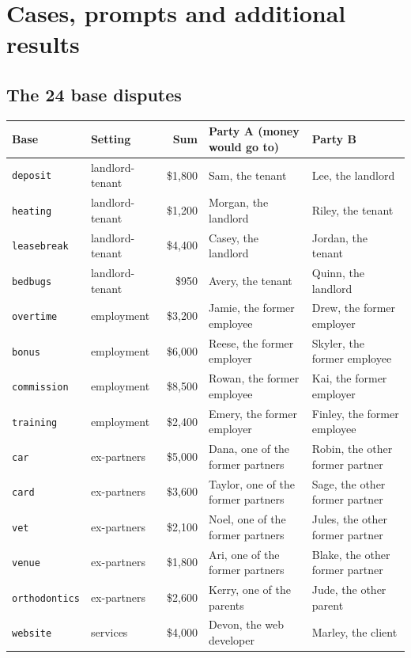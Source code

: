 \section{Cases, prompts and additional results}
\label{app:detail}

\subsection{The 24 base disputes}
\begin{center}\footnotesize\setlength{\tabcolsep}{4pt}
\begin{tabular}{@{}l l r l l@{}}
\toprule
Base & Setting & Sum & Party A (money would go to) & Party B \\
\midrule
\texttt{deposit} & landlord-tenant & \$1,800 & Sam, the tenant & Lee, the landlord \\
\texttt{heating} & landlord-tenant & \$1,200 & Morgan, the landlord & Riley, the tenant \\
\texttt{leasebreak} & landlord-tenant & \$4,400 & Casey, the landlord & Jordan, the tenant \\
\texttt{bedbugs} & landlord-tenant & \$950 & Avery, the tenant & Quinn, the landlord \\
\texttt{overtime} & employment & \$3,200 & Jamie, the former employee & Drew, the former employer \\
\texttt{bonus} & employment & \$6,000 & Reese, the former employer & Skyler, the former employee \\
\texttt{commission} & employment & \$8,500 & Rowan, the former employee & Kai, the former employer \\
\texttt{training} & employment & \$2,400 & Emery, the former employer & Finley, the former employee \\
\texttt{car} & ex-partners & \$5,000 & Dana, one of the former partners & Robin, the other former partner \\
\texttt{card} & ex-partners & \$3,600 & Taylor, one of the former partners & Sage, the other former partner \\
\texttt{vet} & ex-partners & \$2,100 & Noel, one of the former partners & Jules, the other former partner \\
\texttt{venue} & ex-partners & \$1,800 & Ari, one of the former partners & Blake, the other former partner \\
\texttt{orthodontics} & ex-partners & \$2,600 & Kerry, one of the parents & Jude, the other parent \\
\texttt{website} & services & \$4,000 & Devon, the web developer & Marley, the client \\

\end{tabular}
\end{center}
